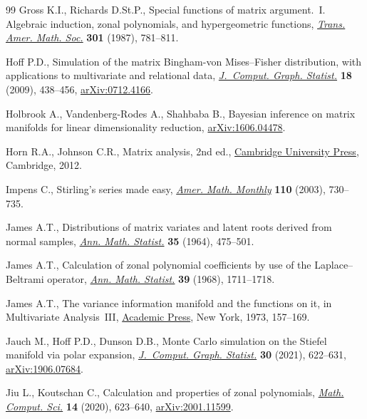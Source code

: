 \documentclass[pdftex]{sigma}
\numberwithin{equation}{section}
\begin{document}
\begin{thebibliography}{99}
Gross K.I., Richards D.St.P., Special functions of matrix argument.~{I}.
 {A}lgebraic induction, zonal polynomials, and hypergeometric functions,
 \href{https://doi.org/10.2307/2000670}{\textit{Trans. Amer. Math. Soc.}} \textbf{301} (1987), 781--811.

Hoff P.D., Simulation of the matrix {B}ingham-von {M}ises--{F}isher
 distribution, with applications to multivariate and relational data,
 \href{https://doi.org/10.1198/jcgs.2009.07177}{\textit{J.~Comput. Graph. Statist.}} \textbf{18} (2009), 438--456,
 \href{https://arxiv.org/abs/0712.4166}{arXiv:0712.4166}.

Holbrook A., Vandenberg-Rodes A., Shahbaba B., Bayesian inference on matrix
 manifolds for linear dimensionality reduction, \href{https://arxiv.org/abs/1606.04478}{arXiv:1606.04478}.

Horn R.A., Johnson C.R., Matrix analysis, 2nd ed., \href{https://doi.org/10.1017/CBO9781139020411}{Cambridge University Press},
 Cambridge, 2012.

Impens C., Stirling's series made easy, \href{https://doi.org/10.2307/3647856}{\textit{Amer. Math. Monthly}}
 \textbf{110} (2003), 730--735.

James A.T., Distributions of matrix variates and latent roots derived from
 normal samples, \href{https://doi.org/10.1214/aoms/1177703550}{\textit{Ann. Math. Statist.}} \textbf{35} (1964), 475--501.

James A.T., Calculation of zonal polynomial coefficients by use of the
 {L}aplace--{B}eltrami operator, \href{https://doi.org/10.1214/aoms/1177698153}{\textit{Ann. Math. Statist.}} \textbf{39}
 (1968), 1711--1718.

James A.T., The variance information manifold and the functions on it, in
 Multivariate {A}nalysis~{III}, \href{https://doi.org/10.1016/B978-0-12-426653-7.50016-8}{Academic Press}, New York, 1973, 157--169.

Jauch M., Hoff P.D., Dunson D.B., Monte {C}arlo simulation on the {S}tiefel
 manifold via polar expansion, \href{https://doi.org/10.1080/10618600.2020.1859382}{\textit{J.~Comput. Graph. Statist.}} \textbf{30}
 (2021), 622--631, \href{https://arxiv.org/abs/1906.07684}{arXiv:1906.07684}.

Jiu L., Koutschan C., Calculation and properties of zonal polynomials,
 \href{https://doi.org/10.1007/s11786-020-00458-0}{\textit{Math. Comput. Sci.}} \textbf{14} (2020), 623--640,
 \href{https://arxiv.org/abs/2001.11599}{arXiv:2001.11599}.


\end{thebibliography}
\end{document}
